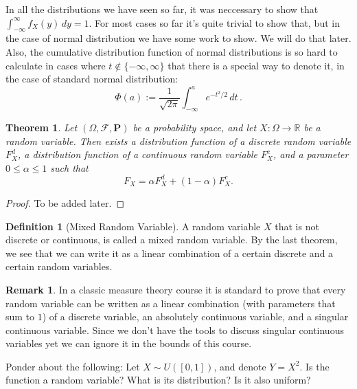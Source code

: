 \documentclass[11pt,a4paper]{article}
\theoremstyle{definition}
\newtheorem{definition}{Definition}[section]
\newtheorem{remark}{Remark}[section]
\theoremstyle{plain}
\newtheorem{theorem}{Theorem}[section]
\newcommand{\R}{\mathbb{R}}
\begin{document}
  In all the distributions we have seen so far, it was neccessary to show
  that $\int_{-\infty}^{\infty} f_X(y)\,dy = 1$. For most cases so far
  it's quite trivial to show that, but in the case of normal distribution
  we have some work to show. We will do that later. 
  Also, the cumulative distribution function of normal distributions is so
  hard to calculate in cases where $t \notin \{-\infty,\infty\}$ that
  there is a special way to denote it, in the case of standard normal
  distribution:
  \[
    \Phi (a) :=
    \frac{1}{\sqrt{2 \pi}}
    \int_{-\infty}^{a} e^{-t^{2}/2}\,dt\,.
  \]
  
  \begin{theorem}
    Let $(\Omega, \mathcal F, \mathbf P)$ be a probability space,
    and let $X \colon \Omega \to \R$ be a random variable.
    Then exists a distribution function of a discrete random variable
    $F_X^d$, a distribution function of a continuous random variable
    $F_X^c$, and a parameter $0 \le \alpha \le 1$ such that
    \[
      F_X = \alpha F_X^d + (1 - \alpha)F_X^c.
    \]
  \end{theorem}
  \begin{proof}
    To be added later.
  \end{proof}

  \begin{definition}[Mixed Random Variable]
    A random variable $X$ that is not discrete or continuous, is called
    a mixed random variable. By the last theorem, we see that we can
    write it as a linear combination of a certain discrete and
    a certain random variables.
  \end{definition}
  
  \begin{remark}
    In a classic measure theory course it is standard to prove that every
    random variable can be written as a linear combination (with parameters
    that sum to $1$) of a discrete variable, an absolutely continuous variable,
    and a singular continuous variable. Since we don't have the tools to
    discuss singular continuous variables yet we can ignore it in the bounds
    of this course.
  \end{remark}
  
  Ponder about the following: 
  Let $X \sim U([0,1])$, and denote $Y = X^2$. Is the function a random
  variable? What is its distribution? Is it also uniform?
\end{document}
